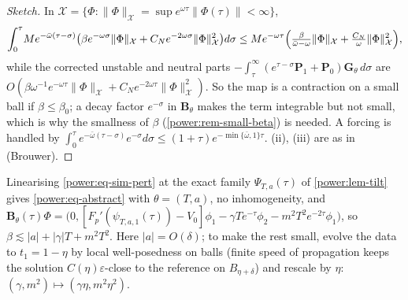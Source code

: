 \begin{proof}[Sketch]
In $\mathcal X=\{\Phi:\|\Phi\|_{\mathcal X}=\sup e^{\omega\tau}\|\Phi(\tau)\|<\infty\}$,
\[
  \int_0^\tau\!Me^{-\bar\omega(\tau-\sigma)}\bigl(\beta e^{-\omega\sigma}\|\Phi\|_{\mathcal X}
  +C_Ne^{-2\omega\sigma}\|\Phi\|_{\mathcal X}^2\bigr)d\sigma
  \le Me^{-\omega\tau}\Bigl(\tfrac{\beta}{\bar\omega-\omega}\|\Phi\|_{\mathcal X}+\tfrac{C_N}{\omega}\|\Phi\|_{\mathcal X}^2\Bigr),
\]
while the corrected unstable and neutral parts
$-\int_\tau^\infty(e^{\tau-\sigma}\mathbf P_1+\mathbf P_0)\mathbf G_\theta\,d\sigma$ are
$O(\beta\omega^{-1}e^{-\omega\tau}\|\Phi\|_{\mathcal X}+C_Ne^{-2\omega\tau}\|\Phi\|_{\mathcal X}^2)$. So the map is
a contraction on a small ball if $\beta\le\beta_0$; a decay factor $e^{-\sigma}$ in
$\mathbf B_\theta$ makes the term integrable but not small, which is why the
smallness of $\beta$ (\cref{power:rem-small-beta}) is needed. A forcing is handled
by $\int_0^\tau e^{-\bar\omega(\tau-\sigma)}e^{-\sigma}d\sigma\le(1+\tau)e^{-\min\{\bar\omega,1\}\tau}$.
(ii), (iii) are as in \cite{DonningerSchoerkhuber2012,Ostermann2024} (Brouwer).
\end{proof}

\begin{remark}\label{power:rem-small-beta}
Linearising \eqref{power:eq-sim-pert} at the exact family $\Psi_{T,a}(\tau)$ of
\cref{power:lem-tilt} gives \eqref{power:eq-abstract} with $\theta=(T,a)$, no
inhomogeneity, and
$\mathbf B_\theta(\tau)\Phi=\bigl(0,[F_p'(\psi_{T,a,1}(\tau))-V_0]\phi_1-\gamma Te^{-\tau}\phi_2-m^2T^2e^{-2\tau}\phi_1\bigr)$,
so $\beta\lesssim|a|+|\gamma|T+m^2T^2$. Here $|a|=O(\delta)$; to make the rest small, evolve
the data to $t_1=1-\eta$ by local well-posedness on balls (finite speed of
propagation keeps the solution $C(\eta)\varepsilon$-close to the reference on
$B_{\eta+\delta}$) and rescale by $\eta$: $(\gamma,m^2)\mapsto(\gamma\eta,m^2\eta^2)$.
\end{remark}

